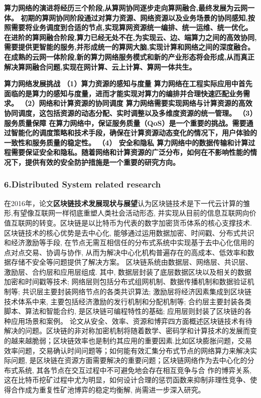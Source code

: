 \documentclass[a4paper,twoside]{scrbook}
\begin{document}
\textbf{算力网络的演进将经历三个阶段,从算网协同逐步走向算网融合,最终发展为云网一体。 初期的算网协同阶段通过对算力资源、网络资源以及业务场景的协同感知,按照需要将业务调度到合适的节点,实现算网资源统一编排、统一运维、统一优化。 在进阶的算网融合阶段,算力已经无处不在,为实现云、边、端算力之间的高效协同,需要提供更智能的服务,并形成统一的算网大脑,实现计算和网络之间的深度融合。 在成熟的云网一体阶段,新的算力网络服务模式和新的产业形态将会形成,从而真正解决算网融合问题,实现在网计算、云上计算、算网一体共生。}

\textbf{算力网络发展挑战
（1）算力资源的感知与度量
算力网络在工程实际应用中首先面临的是算力的感知与度量，进而才能实现对算力的编排并合理快速匹配业务需求。
（2）网络和计算资源的协同调度
算力网络需要实现网络与计算资源的高效协同调度，这包括资源的动态分配、实时调整以及多维度资源的统一管理。
（3） 服务质量保障
在算力网络中，保证服务质量（QoS）是一个重要的挑战。需要通过智能化的调度策略和技术手段，确保在计算资源动态变化的情况下，用户体验的一致性和服务质量的稳定性。
（4） 安全和隐私
算力网络中的数据传输和计算过程需要保证安全和隐私。随着网络和计算资源的广泛分布，如何在不影响性能的情况下，提供有效的安全防护措施是一个重要的研究方向。}

\subsubsection{6.Distributed System related research}
在2016年，论文\textbf{区块链技术发展现状与展望}认为区块链技术是下一代云计算的雏形,有望像互联网一样彻底重塑人类社会活动形态, 并实现从目前的信息互联网向价值互联网的转变。区块链是以比特币为代表的数字加密货币体系的核心支撑技术. 区块链技术的核心优势是去中心化, 能够通过运用数据加密、时间戳、分布式共识和经济激励等手段, 在节点无需互相信任的分布式系统中实现基于去中心化信用的点对点交易、协调与协作, 从而为解决中心化机构普遍存在的高成本、低效率和数据存储不安全等问题提供了解决方案。
区块链系统由数据层、网络层、共识层、激励层、合约层和应用层组成. 其中, 数据层封装了底层数据区块以及相关的数据加密和时间戳等技术; 网络层则包括分布式组网机制、数据传播机制和数据验证机制等; 共识层主要封装网络节点的各类共识算法; 激励层将经济因素集成到区块链技术体系中来, 主要包括经济激励的发行机制和分配机制等; 合约层主要封装各类脚本、算法和智能合约, 是区块链可编程特性的基础; 应用层则封装了区块链的各种应用场景和案例。
论文从安全、效率、资源和博弈四方面概述区块链技术有待解决的问题。区块链的非对称加密机制将随着数学、密码学和计算技术的发展而变的越来越脆弱；区块链效率也是制约其应用的重要因素.比如区块膨胀问题，交易效率问题，交易确认时间问题等；如何能有效汇集分布式节点的网络算力来解决实际问题, 是区块链在资源方面需要解决的重要问题；区块链网络作为去中心化的分布式系统, 其各节点在交互过程中不可避免地会存在相互竞争与合
作的博弈关系, 这在比特币挖矿过程中尤为明显，如何设计合理的惩罚函数来抑制非理性竞争、使得合作成为重复性矿池博弈的稳定均衡解, 尚需进一步深入研究。
\end{document}
